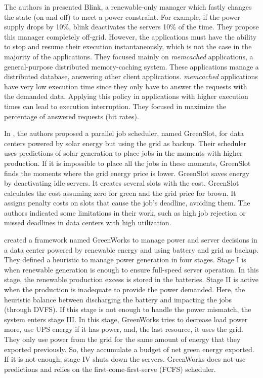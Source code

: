 The authors in \cite{sharma2011blink} presented Blink, a renewable-only manager which fastly changes the state (on and off) to meet a power constraint. For example, if the power supply drops by 10\%, blink deactivates the servers 10\% of the time. They propose this manager completely off-grid. However, the applications must have the ability to stop and resume their execution instantaneously, which is not the case in the majority of the applications. They focused mainly on \textit{memcached} applications, a general-purpose distributed memory-caching system. These applications manage a distributed database, answering other client applications. \textit{memcached} applications have very low execution time since they only have to answer the requests with the demanded data. Applying this policy in applications with higher execution times can lead to execution interruption. They focused in maximize the percentage of answered requests (hit rates).

In \cite{goiri2015matching}, the authors proposed a parallel job scheduler, named GreenSlot, for data centers powered by solar energy but using the grid as backup. Their scheduler uses predictions of solar generation to place jobs in the moments with higher production. If it is impossible to place all the jobs in these moments, GreenSlot finds the moments where the grid energy price is lower. GreenSlot saves energy by deactivating idle servers. It creates several slots with the cost. GreenSlot calculates the cost assuming zero for green and the grid price for brown. It assigns penalty costs on slots that cause the job's deadline, avoiding them. The authors indicated some limitations in their work, such as high job rejection or missed deadlines in data centers with high utilization.

\citeauthor{li2016managing} \cite{li2016managing} created a framework named GreenWorks to manage power and server decisions in a data center powered by renewable energy and using battery and grid as backup. They defined a heuristic to manage power generation in four stages. Stage I is when renewable generation is enough to ensure full-speed server operation. In this stage, the renewable production excess is stored in the batteries. Stage II is active when the production is inadequate to provide the power demanded. Here, the heuristic balance between discharging the battery and impacting the jobs (through DVFS). If this stage is not enough to handle the power mismatch, the system enters stage III. In this stage, GreenWorks tries to decrease load power more, use UPS energy if it has power, and, the last resource, it uses the grid. They only use power from the grid for the same amount of energy that they exported previously. So, they accumulate a budget of net green energy exported. If it is not enough, stage IV shuts down the servers. GreenWorks does not use predictions and relies on the first-come-first-serve (FCFS) scheduler.

